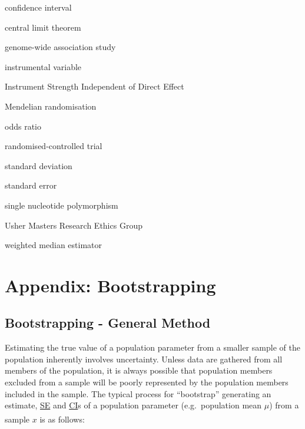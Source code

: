 \documentclass[
]{article}
\providecommand{\tightlist}{%
  \setlength{\itemsep}{0pt}\setlength{\parskip}{0pt}}
\begin{document}
\begin{description}
\tightlist
\item[\phantomsection\label{acronyms_CI}{CI}]
confidence interval
\item[\phantomsection\label{acronyms_CLT}{CLT}]
central limit theorem
\item[\phantomsection\label{acronyms_GWAS}{GWAS}]
genome-wide association study
\item[\phantomsection\label{acronyms_IV}{IV}]
instrumental variable
\item[\phantomsection\label{acronyms_InSIDE}{InSIDE}]
Instrument Strength Independent of Direct Effect
\item[\phantomsection\label{acronyms_MR}{MR}]
Mendelian randomisation
\item[\phantomsection\label{acronyms_OR}{OR}]
odds ratio
\item[\phantomsection\label{acronyms_RCT}{RCT}]
randomised-controlled trial
\item[\phantomsection\label{acronyms_SD}{SD}]
standard deviation
\item[\phantomsection\label{acronyms_SE}{SE}]
standard error
\item[\phantomsection\label{acronyms_SNP}{SNP}]
single nucleotide polymorphism
\item[\phantomsection\label{acronyms_UMREG}{UMREG}]
Usher Masters Research Ethics Group
\item[\phantomsection\label{acronyms_WME}{WME}]
weighted median estimator
\end{description}

\newpage

\section{Appendix: Bootstrapping}\label{appendix-boot}

\subsection{Bootstrapping - General Method}\label{bootstrapping---general-method}

Estimating the true value of a population parameter from a smaller sample of the population inherently involves uncertainty. Unless data are gathered from all members of the population, it is always possible that population members excluded from a sample will be poorly represented by the population members included in the sample. The typical process for ``bootstrap'' generating an estimate, \hyperref[acronyms_SE]{SE} and \hyperref[acronyms_CI]{CI}s of a population parameter (e.g.~population mean \(\mu\)) from a sample \(x\) is as follows\textsuperscript{}:
\end{document}
